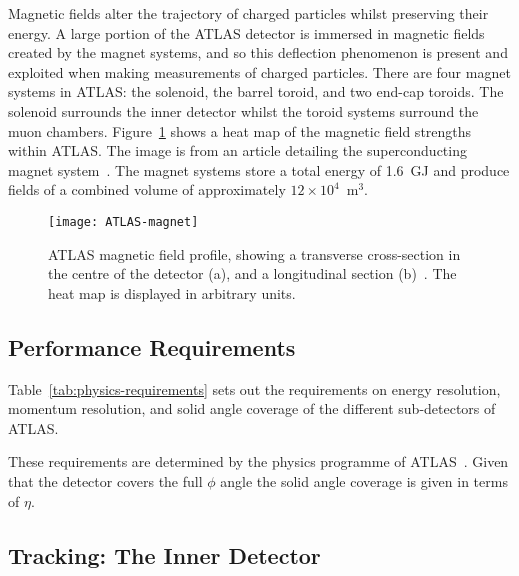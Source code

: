 Magnetic fields alter the trajectory of charged particles whilst preserving
their energy. A large portion of the ATLAS detector is immersed in magnetic
fields created by the magnet systems, and so this deflection phenomenon is
present and exploited when making measurements of charged particles. There are
four magnet systems in ATLAS: the solenoid, the barrel toroid, and two end-cap
toroids. The solenoid surrounds the inner detector whilst the toroid systems
surround the muon chambers. Figure~\ref{fig:ATLAS-magnets} shows a heat map of
the magnetic field strengths within ATLAS. The image is from an article
detailing the superconducting magnet system~\cite{ATLAS-magnets}. The magnet
systems store a total energy of 1.6~GJ and produce fields of a combined volume
of approximately $12\times 10^4$~m$^3$.
\begin{figure}[ht] \centering \texttt{[image: ATLAS-magnet]}
  \caption[ATLAS magnetic field]{ATLAS magnetic field profile, showing a
transverse cross-section in the centre of the detector (a), and a longitudinal
section (b)~\cite{ATLAS-magnets}. The heat map is displayed in arbitrary
units.}%
  \label{fig:ATLAS-magnets}
\end{figure}

\subsection{Performance Requirements}

Table~\ref{tab:physics-requirements} sets out the requirements on energy
resolution, momentum resolution, and solid angle coverage of the different
sub-detectors of ATLAS.

These requirements are determined by the physics programme of
ATLAS~\cite{Collaboration_2008}. Given that the detector covers the full $\phi$
angle the solid angle coverage is given in terms of $\eta$.

\subsection{Tracking: The Inner Detector}%
\label{sec:id}

